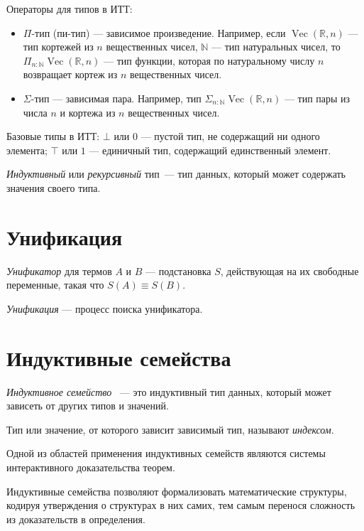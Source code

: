 Операторы для типов в ИТТ:
\begin{itemize}
    \item $\Pi$-тип (пи-тип) — зависимое произведение.
        Например, если $\operatorname{Vec}({\mathbb R}, n)$ — тип кортежей из $n$ вещественных чисел,
        $\mathbb N$ — тип натуральных чисел, то
        $\Pi_{n \mathbin{:} {\mathbb N}} \operatorname{Vec}({\mathbb R}, n)$ 
        — тип функции, которая по натуральному числу $n$ возвращает кортеж из
        $n$ вещественных чисел.
    \item $\Sigma$-тип — зависимая пара.
        Например, тип $\Sigma_{n \mathbin{:} {\mathbb N}} \operatorname{Vec}({\mathbb R}, n)$ — тип 
        пары из числа $n$ и кортежа из $n$ вещественных чисел.
\end{itemize}
Базовые типы в ИТТ:
$\bot$ или $0$ — пустой тип, не содержащий ни одного элемента;
$\top$ или $1$ — единичный тип, содержащий единственный элемент.

\emph{Индуктивный} или \emph{рекурсивный} тип~— тип данных, который может
содержать значения своего типа.

\section{Унификация}

\emph{Унификатор} для термов $A$ и $B$ — подстановка $S$, действующая на их
свободные переменные, такая что $S(A) \equiv S(B)$.

\emph{Унификация} — процесс поиска унификатора.

\section{Индуктивные семейства}

\begin{definition}
\emph{Индуктивное семейство} \cite{DybjerIndFam, RefiningIT}~— это индуктивный тип данных,
который может зависеть от других типов и значений.

Тип или значение, от которого зависит зависимый тип, называют \emph{индексом}.
\end{definition}

Одной из областей применения индуктивных семейств являются системы интерактивного
доказательства теорем.

Индуктивные семейства позволяют формализовать математические структуры, кодируя утверждения о структурах в них самих, тем самым перенося сложность из доказательств в определения.

